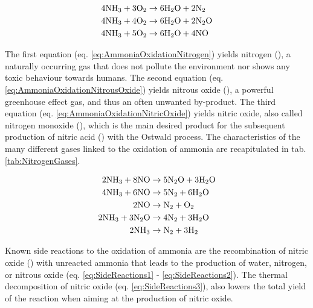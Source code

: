 \begin{align}
    \label{eq:AmmoniaOxidationNitrogen}
    4 \ammonia + 3 \ce{O_2} & \rightarrow 6 \water + 2 \nitrogen \\
    \label{eq:AmmoniaOxidationNitrousOxide}
    4 \ammonia + 4 \ce{O_2} & \rightarrow 6 \water + 2 \nitrousoxide \\
    \label{eq:AmmoniaOxidationNitricOxide}
    4 \ammonia + 5 \ce{O_2} & \rightarrow 6 \water + 4 \nitricoxide
\end{align}

The first equation (eq. \ref{eq:AmmoniaOxidationNitrogen}) yields nitrogen (\nitrogen), a naturally occurring gas that does not pollute the environment nor shows any toxic behaviour towards humans.
The second equation (eq. \ref{eq:AmmoniaOxidationNitrousOxide}) yields nitrous oxide (\nitrousoxide), a powerful greenhouse effect gas, and thus an often unwanted by-product.
The third equation (eq. \ref{eq:AmmoniaOxidationNitricOxide}) yields nitric oxide, also called nitrogen monoxide (\nitricoxide), which is the main desired product for the subsequent production of nitric acid (\nitricacid) with the Ostwald process.
The characteristics of the many different gases linked to the oxidation of ammonia are recapitulated in tab. \ref{tab:NitrogenGases}.

\begin{align}
    \label{eq:SideReactions1}
    2 \ammonia + 8 \nitricoxide & \rightarrow 5 \nitrousoxide + 3 \water\\
    \label{eq:SideReactions2}
    4 \ammonia + 6 \nitricoxide & \rightarrow 5 \nitrogen + 6 \water\\
    \label{eq:SideReactions3}
    2 \nitricoxide & \rightarrow \nitrogen + \ce{O_2}\\
    \label{eq:SideReactions4}
    2 \ammonia + 3 \nitrousoxide & \rightarrow 4 \nitrogen + 3 \water\\
    \label{eq:SideReactions5}
    2 \ammonia & \rightarrow \nitrogen + 3 \ce{H_2}
\end{align}

Known side reactions to the oxidation of ammonia are the recombination of nitric oxide () with unreacted ammonia that leads to the production of water, nitrogen, or nitrous oxide (eq. \ref{eq:SideReactions1} - \ref{eq:SideReactions2}).
The thermal decomposition of nitric oxide (eq. \ref{eq:SideReactions3}), also lowers the total yield of the reaction when aiming at the production of nitric oxide.

